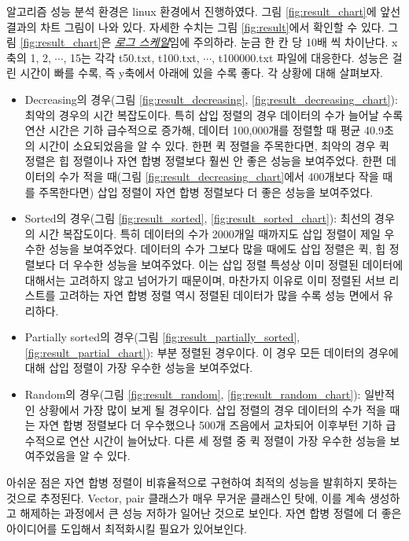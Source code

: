 \documentclass{article}
\begin{document}
알고리즘 성능 분석 환경은 linux 환경에서 진행하였다. 그림 \ref{fig:result_chart}에 앞선 결과의 차트 그림이 나와 있다. 자세한 수치는 그림 \ref{fig:result}에서 확인할 수 있다. 그림 \ref{fig:result_chart}은 \underline{\textit{로그 스케일}}임에 주의하라. 눈금 한 칸 당 10배 씩 차이난다. x축의 1, 2, $\cdots$, 15는 각각 t50.txt, t100.txt, $\cdots$, t100000.txt 파일에 대응한다. 성능은 걸린 시간이 빠를 수록, 즉 y축에서 아래에 있을 수록 좋다.
각 상황에 대해 살펴보자.
\begin{itemize}
    \item Decreasing의 경우(그림 \ref{fig:result_decreasing}, \ref{fig:result_decreasing_chart}): 최악의 경우의 시간 복잡도이다. 특히 삽입 정렬의 경우 데이터의 수가 늘어날 수록 연산 시간은 기하 급수적으로 증가해, 데이터 100,000개를 정렬할 때 평균 40.9초의 시간이 소요되었음을 알 수 있다. 한편 퀵 정렬을 주목한다면, 최악의 경우 퀵 정렬은 힙 정렬이나 자연 합병 정렬보다 훨씬 안 좋은 성능을 보여주었다. 한편 데이터의 수가 적을 때(그림 \ref{fig:result_decreasing_chart}에서 400개보다 작을 때를 주목한다면) 삽입 정렬이 자연 합병 정렬보다 더 좋은 성능을 보여주었다.
    \item Sorted의 경우(그림 \ref{fig:result_sorted}, \ref{fig:result_sorted_chart}): 최선의 경우의 시간 복잡도이다. 특히 데이터의 수가 2000개일 때까지도 삽입 정렬이 제일 우수한 성능을 보여주었다. 데이터의 수가 그보다 많을 때에도 삽입 정렬은 퀵, 힙 정렬보다 더 우수한 성능을 보여주었다. 이는 삽입 정렬 특성상 이미 정렬된 데이터에 대해서는 고려하지 않고 넘어가기 때문이며, 마찬가지 이유로 이미 정렬된 서브 리스트를 고려하는 자연 합병 정렬 역시 정렬된 데이터가 많을 수록 성능 면에서 유리하다.
    \item Partially sorted의 경우(그림 \ref{fig:result_partially_sorted}, \ref{fig:result_partial_chart}): 부분 정렬된 경우이다. 이 경우 모든 데이터의 경우에 대해 삽입 정렬이 가장 우수한 성능을 보여주었다.
    \item Random의 경우(그림 \ref{fig:result_random}, \ref{fig:result_random_chart}): 일반적인 상황에서 가장 많이 보게 될 경우이다. 삽입 정렬의 경우 데이터의 수가 적을 때는 자연 합병 정렬보다 더 우수했으나 500개 즈음에서 교차되어 이후부턴 기하 급수적으로 연산 시간이 늘어났다. 다른 세 정렬 중 퀵 정렬이 가장 우수한 성능을 보여주었음을 알 수 있다.
\end{itemize}
아쉬운 점은 자연 합병 정렬이 비휴율적으로 구현하여 최적의 성능을 발휘하지 못하는 것으로 추정된다. Vector, pair 클래스가 매우 무거운 클래스인 탓에, 이를 계속 생성하고 해제하는 과정에서 큰 성능 저하가 일어난 것으로 보인다. 자연 합병 정렬에 더 좋은 아이디어를 도입해서 최적화시킬 필요가 있어보인다.
\end{document}
